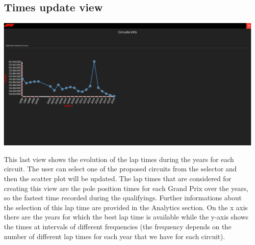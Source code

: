 \documentclass[10pt,twocolumn,letterpaper]{article}
\begin{document}
\subsection{Times update view}
\begin{center}
	\centering
	\includegraphics[width=\columnwidth]{timesupdate}
\end{center}
This last view shows the evolution of the lap times during the years for each circuit. The user can select one of the proposed circuits from the selector and then the scatter
plot will be updated. The lap times that are considered for creating this view are the pole position times for each Grand Prix over the years, so the fastest time
recorded during the qualifyings. Further informations about the selection of this lap time are provided in the Analytics section. On the x axis there are the years for which the
best lap time is available while the y-axis shows the times at intervals of different frequencies (the frequency depends on the number of different lap times for each year that
we have for each circuit).
\end{document}
